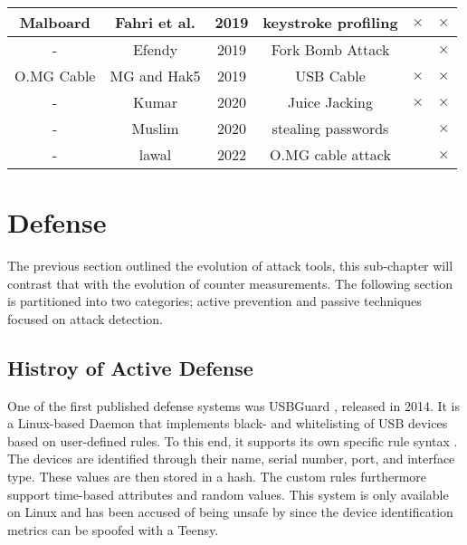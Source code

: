{\begin{tabular}{|c c c c c c|}
 \hline
 Malboard & Fahri et al. \cite{farhiMalboardNovelUser2019} & 2019 & keystroke profiling & $\times$ & $\times$\\
 \hline
  - & Efendy\cite{efendyExploringPossibilityUSB2019} & 2019 & Fork Bomb Attack & & $\times$ \\
 \hline
 O.MG Cable & MG and Hak5  \cite{hak5MGCable} \cite{MGCable2019a} & 2019 & USB Cable & $\times$ & $\times$ \\
 \hline
- & Kumar \cite{kumarJuiceJackingUSB2020} & 2020 & Juice Jacking & $\times$ & $\times$ \\
\hline
- & Muslim \cite{muslimImplementationAnalysisUSB2020} & 2020 & stealing passwords & & $\times$ \\
\hline
-  & lawal \cite{lawalFacilitatingCyberenabledFraud2022} & 2022 & O.MG cable attack & & $\times$ \\
 \hline 
\end{tabular}
\label{attack_table}
}


\section{Defense} \label{HistoryOfDefense}

The previous section outlined the evolution of attack tools, this sub-chapter will contrast that with the evolution of counter measurements. 
The following section is partitioned into two categories; active prevention and passive techniques focused on attack detection.

\subsection{Histroy of Active Defense}

One of the first published defense systems was USBGuard \cite{HomeUSBGuard}, released in 2014. It is a Linux-based Daemon that implements black- and whitelisting of USB devices based on user-defined rules. To this end, it supports its own specific rule syntax \cite{RuleLanguageUSBGuard}. The devices are identified through their name, serial number, port, and interface type. These values are then stored in a hash. The custom rules furthermore support time-based attributes and random values. This system is only available on Linux and has been accused of being unsafe by \cite{farhiMalboardNovelUser2019} since the device identification metrics can be spoofed with a Teensy. 

